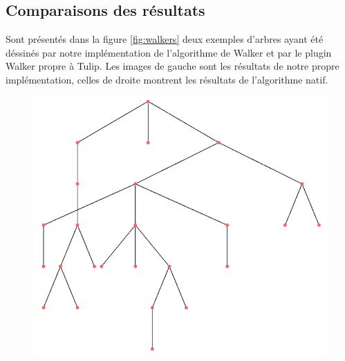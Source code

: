 \documentclass{article}
\begin{document}
\subsection{Comparaisons des résultats}

Sont présentés dans la figure \ref{fig:walkers} deux exemples d'arbres ayant été déssinés par notre implémentation de l'algorithme de Walker et par le plugin Walker propre à Tulip. Les images de gauche sont les résultats de notre propre implémentation, celles de droite montrent les résultats de l'algorithme natif.

\newpage
\vfill
  \begin{figure}[h]
      \begin{center}
        \begin{left}
          \includegraphics[scale=0.22]{exemple1.png}
        \end{left}
        \begin{right}

\end{right}
\end{center}
\end{figure}
\end{document}
